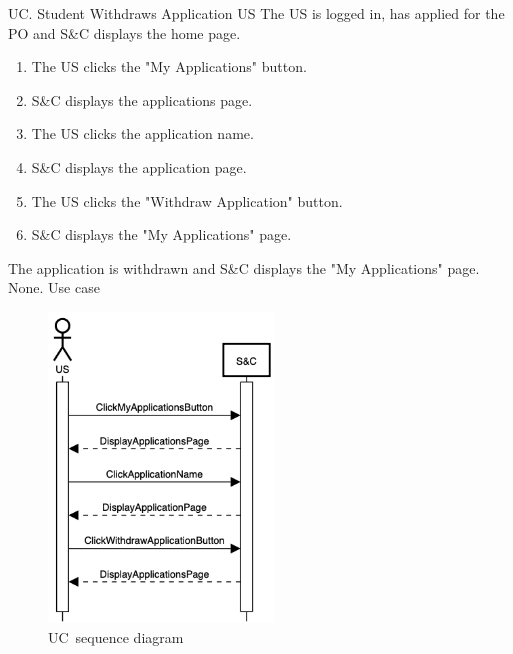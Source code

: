 
\clearpage
\begin{usecase}
    {UC\theuc. Student Withdraws Application}
    {US}
    {The US is logged in, has applied for the PO and S\&C displays the home page.}
    {\begin{enumerate}[leftmargin=*]
        \item The US clicks the "My Applications" button.
        \item S\&C displays the applications page.
        \item The US clicks the application name.
        \item S\&C displays the application page.
        \item The US clicks the "Withdraw Application" button.
        \item S\&C displays the "My Applications" page.
    \end{enumerate}}
    {The application is withdrawn and S\&C displays the "My Applications" page.}
    {None.}
    {Use case \theuc}
\end{usecase}

\begin{figure}[h]
    \centering
    \includegraphics[width=6cm]{images/sequence-diagrams/student-withdraws-application.png}
    \caption{UC\theuc\ sequence diagram}
\end{figure}


